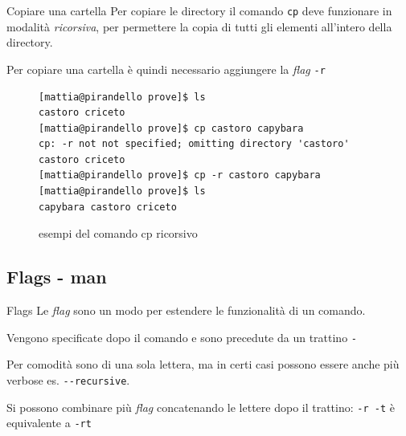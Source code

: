 \begin{frame}[fragile]{Copiare una cartella}
  Per copiare le directory il comando \texttt{cp} deve funzionare in modalità 
  \textit{ricorsiva}, per permettere la copia di tutti gli elementi all'intero
  della directory.\bigskip

  Per copiare una cartella è quindi necessario aggiungere la \textit{flag} 
  \texttt{-r}
  \begin{figure}
    \begin{lstlisting}[basicstyle=\footnotesize]
[mattia@pirandello prove]$ ls 
castoro criceto
[mattia@pirandello prove]$ cp castoro capybara 
cp: -r not not specified; omitting directory 'castoro'
castoro criceto
[mattia@pirandello prove]$ cp -r castoro capybara 
[mattia@pirandello prove]$ ls 
capybara castoro criceto
    \end{lstlisting}
    \caption{esempi del comando cp ricorsivo}
  \end{figure}
\end{frame}

\subsection{Flags - man}
\begin{frame}{Flags}
  Le \textit{flag} sono un modo per estendere le funzionalità di un 
  comando.\bigskip

  Vengono specificate dopo il comando e sono precedute da un trattino 
  \texttt{-}\bigskip

  Per comodità sono di una sola lettera, ma in certi casi possono essere anche 
  più verbose es. \texttt{-{}-recursive}.\bigskip

  Si possono combinare più \textit{flag} concatenando le lettere dopo il 
  trattino: \texttt{-r -t} è equivalente a \texttt{-rt}
\end{frame}

